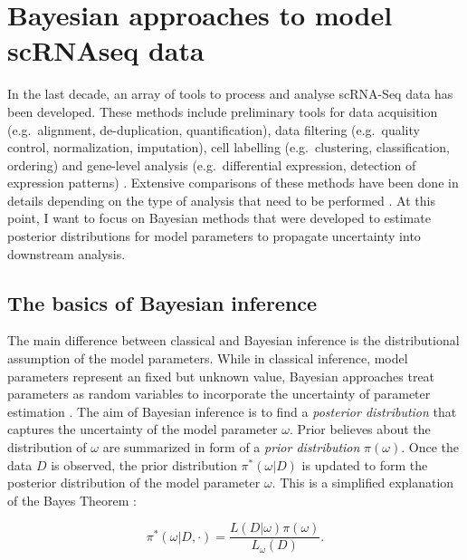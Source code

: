 
\section{Bayesian approaches to model scRNAseq data}

In the last decade, an array of tools to process and analyse scRNA-Seq data has been developed. These methods include preliminary tools for data acquisition (e.g.~alignment, de-duplication, quantification), data filtering (e.g.~quality control, normalization, imputation), cell labelling (e.g.~clustering, classification, ordering) and gene-level analysis (e.g.~differential expression, detection of expression patterns) \citep{Zappia2018}. Extensive comparisons of these methods have been done in details depending on the type of analysis that need to be performed \citep{Saelens2018, Soneson2018}. At this point, I want to focus on Bayesian methods that were developed to estimate posterior distributions for model parameters to propagate uncertainty into downstream analysis. \\

\subsection{The basics of Bayesian inference}

The main difference between classical and Bayesian inference is the distributional assumption of the model parameters. While in classical inference, model parameters represent an fixed but unknown value, Bayesian approaches treat parameters as random variables to incorporate the uncertainty of parameter estimation \citep{Bernardo2003}. The aim of Bayesian inference is to find a \emph{posterior distribution} that captures the uncertainty of the model parameter $\omega$. Prior believes about the distribution of $\omega$ are summarized in form of a \emph{prior distribution} $\pi(\omega)$. Once the data $D$ is observed, the prior distribution $\pi^*(\omega|D)$  is updated to form the posterior distribution of the model parameter $\omega$. This is a simplified explanation of the Bayes Theorem \cite{Canton1763}:

\begin{equation} \label{eq0:Bayes_theorem}
\pi^*(\omega|D,\cdot)=\frac{L(D|\omega)\pi(\omega)}{L_\omega(D)}.
\end{equation}

